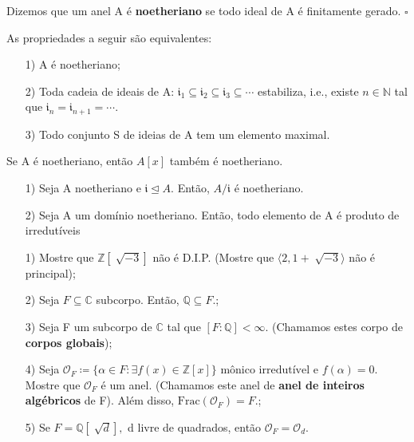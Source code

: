 \documentclass[algebraII_notes.tex]{subfiles}
\begin{document}
\begin{def*}
	Dizemos que um anel A é \textbf{noetheriano} se todo ideal de A é finitamente gerado. \(\square\)
\end{def*}
\begin{prop*}[Exercício]
	As propriedades a seguir são equivalentes:
	\begin{itemize}
		\item[1)] A é noetheriano;
		\item[2)] Toda cadeia de ideais de A: \(\mathfrak{i}_{1}\subseteq{}\mathfrak{i}_{2}\subseteq{}\mathfrak{i}_{3}\subseteq{\cdots}\) estabiliza, i.e.,
		      existe \(n\in \mathbb{N}\) tal que \(\mathfrak{i}_{n} = \mathfrak{i}_{n+1} = \cdots.\)
		\item[3)] Todo conjunto S de ideias de A tem um elemento maximal.
	\end{itemize}
\end{prop*}
\begin{theorem*}
	Se A é noetheriano, então \(A[x]\) também é noetheriano.
\end{theorem*}
\begin{prop*}[Exercícios]
	\begin{itemize}
		\item[1)] Seja A noetheriano e \(\mathfrak{i}\trianglelefteq{A}.\) Então, \(A/\mathfrak{i}\) é noetheriano.
		\item[2)] Seja A um domínio noetheriano. Então, todo elemento de A é produto de irredutíveis
	\end{itemize}
\end{prop*}
\begin{example}
	\begin{itemize}
		\item[1)] Mostre que \(\mathbb{Z}[\sqrt[]{-3}]\) não é D.I.P. (Mostre que \(\langle 2, 1 + \sqrt[]{-3} \rangle\) não é principal);
		\item[2)] Seja \(F\subseteq{\mathbb{C}}\) subcorpo. Então, \(\mathbb{Q}\subseteq{F}.\);
		\item[3)] Seja F um subcorpo de \(\mathbb{C}\) tal que \([F:\mathbb{Q}]<\infty\). (Chamamos estes corpo de \textbf{corpos globais});
		\item[4)] Seja \(\mathcal{O}_{F}\coloneqq \{\alpha \in F: \exists f(x)\in \mathbb{Z}[x]\} \text{ mônico irredutível e } f(\alpha ) = 0\). Mostre que
		      \(\mathcal{O}_{F}\) é um anel. (Chamamos este anel de \textbf{anel de inteiros algébricos} de F). Além disso, \(\mathrm{Frac}(\mathcal{O}_{F}) = F.\);
		\item[5)] Se \(F = \mathbb{Q}[\sqrt[]{d}],\) d livre de quadrados, então \(\mathcal{O}_{F} = \mathcal{O}_{d}.\)
	\end{itemize}
\end{example}
\end{document}
